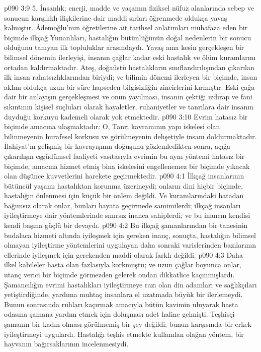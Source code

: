 \vs p090 3:9 5.\bibnobreakspace {} İnsanlık; enerji, madde ve yaşamın fiziksel nüfuz alanlarında sebep ve sonucun karşılıklı ilişkilerine dair maddi sırları öğrenmede oldukça yavaş kalmıştır. Âdemoğlu’nun öğretilerine ait tarihsel anlatımları muhafaza eden bir biçimde ilkçağ Yunanlıları, hastalığın bütünlüğünün doğal nedenlerin bir sonucu olduğunu tanıyan ilk topluluklar arasındaydı. Yavaş ama kesin gerçekleşen bir bilimsel dönemin ilerleyişi, insanın çağlar kadar eski hastalık ve ölüm kuramlarını ortadan kaldırmaktadır. Ateş, doğaüstü hastalıkların sınıflandırılışından çıkarılan ilk insan rahatsızlıklarından biriydi; ve bilimin dönemi ilerleyen bir biçimde, insan aklını oldukça uzun bir süre hapseden bilgisizliğin zincirlerini kırmıştır. Eski çağa dair bir anlayışın gerçekleşmesi ve onun yayılması, insanın çektiği ızdırap ve fani sıkıntının kişisel suçluları olarak hayaletler, ruhaniyetler ve tanrılara dair insanın duyduğu korkuyu kademeli olarak yok etmektedir.
\vs p090 3:10 Evrim hatasız bir biçimde amacına ulaşmaktadır: O, Tanrı kavramının yapı iskelesi olan bilinmeyenin hurafesel korkusu ve görülmeyenin dehşetiyle insanı doldurmaktadır. İlahiyat’ın gelişmiş bir kavrayışının doğuşunu gözlemledikten sonra, açığa çıkarılışın eşgüdümsel faaliyeti vasıtasıyla evrimin bu aynı yöntemi hatasız bir biçimde, amacına hizmet etmiş bina iskelesini engellenemez bir biçimde yıkacak olan düşünce kuvvetlerini harekete geçirmektedir.
\vs p090 4:1 İlkçağ insanlarının bütüncül yaşamı hastalıktan korunma üzerineydi; onların dini hiçbir biçimde, hastalığın önlenmesi için küçük bir önlem değildi. Ve kuramlarındaki hatadan bağımsız olarak onlar, bunları hayata geçirmede samimilerdi; ilkçağ insanları iyileştirmeye dair yöntemlerinde sınırsız inanca sahiplerdi; ve bu inancın kendisi kendi başına güçlü bir devaydı.
\vs p090 4:2 Bu ilkçağ şamanlarından bir tanesinin budalaca hizmeti altında iyileşmek için gereken inanç, sonuçta, hastalığın bilimsel olmayan iyileştirme yöntemlerini uygulayan daha sonraki varislerinden bazılarının ellerinde iyileşmek için gerekenden maddi olarak farklı değildi.
\vs p090 4:3 Daha ilkel kabileler hasta olan fazlasıyla korkmuştu; ve uzun çağlar boyunca onlar, utanç verici bir biçimde görmezden gelerek ondan dikkatlice kaçınmışlardı. Şamancılığın evrimi hastalıkları iyileştirmeye razı olan din adamları ve sağlıkçıları yetiştirdiğinde, yardıma muhtaç insanlara el uzatmada büyük bir ilerlemeydi. Bunun sonrasında ruhları kaçırmak amacıyla bütün kavimin uluyarak hasta odasına şamana yardım etmek için doluşması adet haline gelmişti. Teşhisçi şamanın bir kadın olması görülmemiş bir şey değildi; bunun karşısında bir erkek iyileştirmeyi uygulardı. Hastalığı teşhis etmekte kullanılan olağan yöntem, bir hayvanın bağırsaklarının incelenmesiydi.
